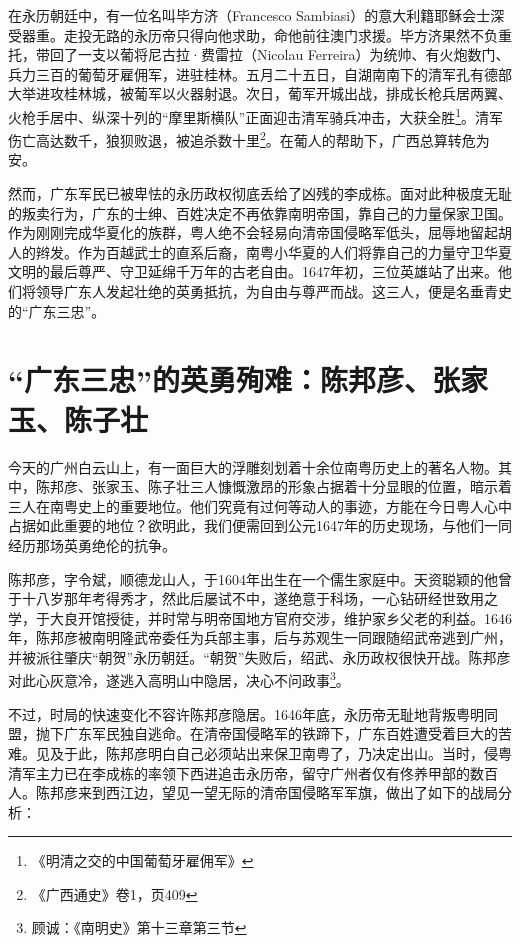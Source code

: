在永历朝廷中，有一位名叫毕方济（Francesco Sambiasi）的意大利籍耶稣会士深受器重。走投无路的永历帝只得向他求助，命他前往澳门求援。毕方济果然不负重托，带回了一支以葡将尼古拉·费雷拉（Nicolau Ferreira）为统帅、有火炮数门、兵力三百的葡萄牙雇佣军，进驻桂林。五月二十五日，自湖南南下的清军孔有德部大举进攻桂林城，被葡军以火器射退。次日，葡军开城出战，排成长枪兵居两翼、火枪手居中、纵深十列的“摩里斯横队”正面迎击清军骑兵冲击，大获全胜\footnote{《明清之交的中国葡萄牙雇佣军》}。清军伤亡高达数千，狼狈败退，被追杀数十里\footnote{《广西通史》卷1，页409}。在葡人的帮助下，广西总算转危为安。

然而，广东军民已被卑怯的永历政权彻底丢给了凶残的李成栋。面对此种极度无耻的叛卖行为，广东的士绅、百姓决定不再依靠南明帝国，靠自己的力量保家卫国。作为刚刚完成华夏化的族群，粤人绝不会轻易向清帝国侵略军低头，屈辱地留起胡人的辫发。作为百越武士的直系后裔，南粤小华夏的人们将靠自己的力量守卫华夏文明的最后尊严、守卫延绵千万年的古老自由。1647年初，三位英雄站了出来。他们将领导广东人发起壮绝的英勇抵抗，为自由与尊严而战。这三人，便是名垂青史的“广东三忠”。

\section{“广东三忠”的英勇殉难：陈邦彦、张家玉、陈子壮}

今天的广州白云山上，有一面巨大的浮雕刻划着十余位南粤历史上的著名人物。其中，陈邦彦、张家玉、陈子壮三人慷慨激昂的形象占据着十分显眼的位置，暗示着三人在南粤史上的重要地位。他们究竟有过何等动人的事迹，方能在今日粤人心中占据如此重要的地位？欲明此，我们便需回到公元1647年的历史现场，与他们一同经历那场英勇绝伦的抗争。

陈邦彦，字令斌，顺德龙山人，于1604年出生在一个儒生家庭中。天资聪颖的他曾于十八岁那年考得秀才，然此后屡试不中，遂绝意于科场，一心钻研经世致用之学，于大良开馆授徒，并时常与明帝国地方官府交涉，维护家乡父老的利益。1646年，陈邦彦被南明隆武帝委任为兵部主事，后与苏观生一同跟随绍武帝逃到广州，并被派往肇庆“朝贺”永历朝廷。“朝贺”失败后，绍武、永历政权很快开战。陈邦彦对此心灰意冷，遂逃入高明山中隐居，决心不问政事\footnote{顾诚：《南明史》第十三章第三节}。

不过，时局的快速变化不容许陈邦彦隐居。1646年底，永历帝无耻地背叛粤明同盟，抛下广东军民独自逃命。在清帝国侵略军的铁蹄下，广东百姓遭受着巨大的苦难。见及于此，陈邦彦明白自己必须站出来保卫南粤了，乃决定出山。当时，侵粤清军主力已在李成栋的率领下西进追击永历帝，留守广州者仅有佟养甲部的数百人。陈邦彦来到西江边，望见一望无际的清帝国侵略军军旗，做出了如下的战局分析：

